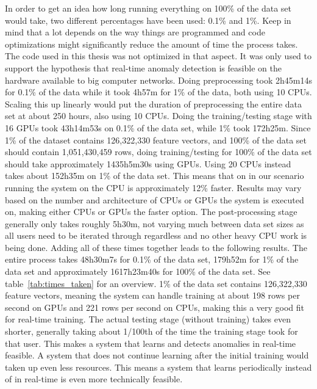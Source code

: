 In order to get an idea how long running everything on 100\% of the data set would take, two different percentages have been used: 0.1\% and 1\%. Keep in mind that a lot depends on the way things are programmed and code optimizations might significantly reduce the amount of time the process takes. The code used in this thesis was not optimized in that aspect. It was only used to support the hypothesis that real-time anomaly detection is feasible on the hardware available to big computer networks. Doing preprocessing took 2h45m14s for 0.1\% of the data while it took 4h57m for 1\% of the data, both using 10 CPUs. Scaling this up linearly would put the duration of preprocessing the entire data set at about 250 hours, also using 10 CPUs. Doing the training/testing stage with 16 GPUs took 43h14m53s on 0.1\% of the data set, while 1\% took 172h25m. Since 1\% of the dataset contains 126,322,330 feature vectors, and 100\% of the data set should contain 1,051,430,459 rows, doing training/testing for 100\% of the data set should take approximately 1435h5m30s using GPUs. Using 20 CPUs instead takes about 152h35m on 1\% of the data set. This means that on in our scenario running the system on the CPU is approximately 12\% faster. Results may vary based on the number and architecture of CPUs or GPUs the system is executed on, making either CPUs or GPUs the faster option. The post-processing stage generally only takes roughly 5h30m, not varying much between data set sizes as all users need to be iterated through regardless and no other heavy CPU work is being done. Adding all of these times together leads to the following results. The entire process takes 48h30m7s for 0.1\% of the data set, 179h52m for 1\% of the data set and approximately 1617h23m40s for 100\% of the data set. See table~\ref{tab:times_taken} for an overview. 1\% of the data set contains 126,322,330 feature vectors, meaning the system can handle training at about 198 rows per second on GPUs and 221 rows per second on CPUs, making this a very good fit for real-time training. The actual testing stage (without training) takes even shorter, generally taking about 1/100th of the time the training stage took for that user. This makes a system that learns and detects anomalies in real-time feasible. A system that does not continue learning after the initial training would taken up even less resources. This means a system that learns periodically instead of in real-time is even more technically feasible.

